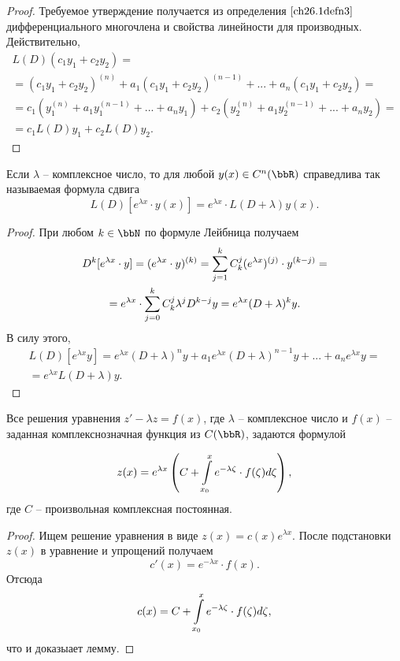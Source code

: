 \begin{proof}
Требуемое утверждение получается из определения $\ref{ch26.1defn3}$ дифференциального многочлена и свойства линейности для производных. Действительно,
\begin{multline*}
L(D)(c_1y_1+c_2y_2)=\\=(c_1y_1+c_2y_2)^{(n)}+a_1(c_1y_1+c_2y_2)^{(n-1)}+...+a_n(c_1y_1+c_2y_2)=\\=c_1(y_1^{(n)}+a_1y_1^{(n-1)}+...+a_ny_1)+c_2(y_2^{(n)}+a_1y_2^{(n-1)}+...+a_ny_2)=\\=c_1L(D)y_1+c_2L(D)y_2.
\end{multline*}
\end{proof}

\begin{lemm} \label{ch26lemm1.2}
Если $\lambda$ -- комплексное число, то для любой $y(x)\in C^n(\bbR)$ справедлива так называемая формула сдвига
$$
L(D)\left[e^{\lambda x}\cdot y(x)\right]=e^{\lambda x}\cdot L(D+\lambda)y(x).
$$
\end{lemm}
\begin{proof}
При любом $k\in \bbN$ по формуле Лейбница получаем
\begin{multline*}
D^k[e^{\lambda x}\cdot y]=(e^{\lambda x}\cdot y)^{(k)}=\sum_{j=1}^{k}\limits C_k^j(e^{\lambda x})^{(j)}\cdot y^{(k-j)}=\\=e^{\lambda x}\cdot \sum_{j=0}^{k}\limits C_k^j\lambda^jD^{k-j}y=e^{\lambda x}(D+\lambda)^ky.
\end{multline*}
В силу этого,
\begin{multline*}
L(D)[e^{\lambda x}y]=e^{\lambda x}(D+\lambda)^ny+a_1e^{\lambda x}(D+\lambda)^{n-1}y+...+a_ne^{\lambda x}y=\\=e^{\lambda x}L(D+\lambda)y.
\end{multline*}
\end{proof}

\begin{lemm} \label{ch26lemm1.3}
Все решения уравнения $z'-\lambda z = f(x)$, где $\lambda$ -- комплексное число и $f(x)$ -- заданная комплекснозначная функция из $C(\bbR)$, задаются формулой
	
$$
z(x)=e^{\lambda x}\left(C+ \int_{x_0}^{x}\limits e^{-\lambda\zeta}\cdot f(\zeta)d\zeta\right),
$$
где $C$ -- произвольная комплексная постоянная. 
\end{lemm}

\begin{proof}
Ищем решение уравнения в виде $z(x)=c(x)e^{\lambda x}$. После подстановки $z(x)$ в уравнение и упрощений получаем 
$$
c'(x)=e^{-\lambda x}\cdot f(x).
$$
Отсюда
$$
c(x)=C+\int_{x_0}^{x}\limits e^{-\lambda\zeta}\cdot f(\zeta)d\zeta,
$$
что и доказыает лемму.
\end{proof}

